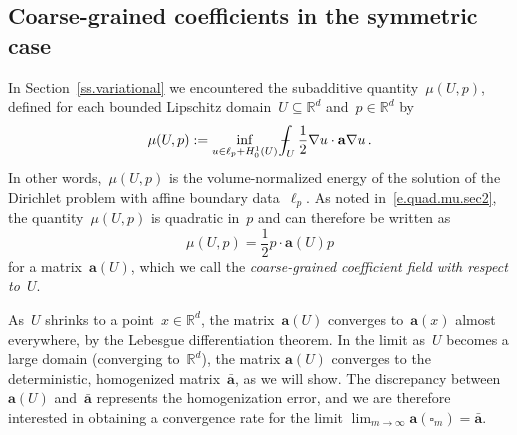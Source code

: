 \documentclass[11pt]{article} %
\let\oldsquare\square %
\renewcommand{\square}{\oldsquare}
\numberwithin{equation}{section}
\theoremstyle{definition}
\newcommand*{\Rd}{\ensuremath{\mathbb{R}^d}}
\renewcommand{\a}{\mathbf{a}}
\newcommand{\ahom}{\bar{\a}}
\newcommand{\cu}{\square}
\def\Xint#1{\mathchoice
{\XXint\displaystyle\textstyle{#1}}%
{\XXint\textstyle\scriptstyle{#1}}%
{\XXint\scriptstyle\scriptscriptstyle{#1}}%
{\XXint\scriptscriptstyle\scriptscriptstyle{#1}}%
\!\int}
\def\XXint#1#2#3{{\setbox0=\hbox{$#1{#2#3}{\int}$}
\vcenter{\hbox{$#2#3$}}\kern-.5\wd0}}
\def\fint{\Xint-}
\begin{document}
\subsection{Coarse-grained coefficients in the symmetric case}
\label{ss.subadd}

In Section~\ref{ss.variational} we encountered the subadditive quantity~$\mu(U,p)$, defined for each bounded Lipschitz domain~$U\subseteq \Rd$ and~$p\in\Rd$ by
\begin{equation}
\label{e.mu}
\mu(U,p) 
:= \inf_{u \in \ell_p+H^1_0(U)} 
\fint_U \frac12\nabla u \cdot \a\nabla u 
\,.
\end{equation}
In other words,~$\mu(U,p)$ is the volume-normalized energy of the solution of the Dirichlet problem with affine boundary data~$\ell_p$.
As noted in~\eqref{e.quad.mu.sec2}, the quantity~$\mu(U,p)$ is quadratic in~$p$ and  
can therefore be written as
\begin{equation}
\label{e.quad.mu}
\mu(U,p) = \frac12 p\cdot \a(U) p
\end{equation}
for a matrix~$\a(U)$, which we call the \emph{coarse-grained coefficient field with respect to~$U$}.

\smallskip

As~$U$ shrinks to a point~$x\in\Rd$, the matrix~$\a(U)$ converges to~$\a(x)$ almost everywhere, by the Lebesgue differentiation theorem. In the limit as~$U$ becomes a large domain (converging to~$\Rd$), the matrix $\a(U)$ converges to the deterministic, homogenized matrix~$\ahom$, as we will show. The discrepancy between~$\a(U)$ and~$\ahom$ represents the homogenization error, and we are therefore interested in obtaining a convergence rate for the limit $\lim_{m\to \infty} \a(\cu_m) = \ahom$.

\smallskip
\end{document}
